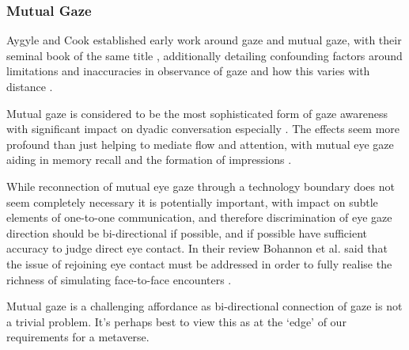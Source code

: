 \subsubsection{Mutual Gaze}
Aygyle and Cook established early work around gaze and mutual gaze, with their seminal book of the same title \cite{Argyle1976}, additionally detailing confounding factors around limitations and inaccuracies in observance of gaze and how this varies with distance \cite{Argyle1969, Argyle1988, Cook1977}.\par
Mutual gaze is considered to be the most sophisticated form of gaze awareness with significant impact on dyadic conversation especially \cite{Cook1977, Kleinke1986, Fagel2010}. The effects seem more profound than just helping to mediate flow and attention, with mutual eye gaze aiding in memory recall and the formation of impressions \cite{Bohannon2013}.\par
While reconnection of mutual eye gaze through a technology boundary does not seem completely necessary it is potentially important, with impact on subtle elements of one-to-one communication, and therefore discrimination of eye gaze direction should be bi-directional if possible, and if possible have sufficient accuracy to judge direct eye contact. In their review Bohannon et al. said that the issue of rejoining eye contact must be addressed in order to fully realise the richness of simulating face-to-face encounters \cite{Bohannon2013}.\par
Mutual gaze is a challenging affordance as bi-directional connection of gaze is not a trivial problem. It's perhaps best to view this as at the `edge' of our requirements for a metaverse.
